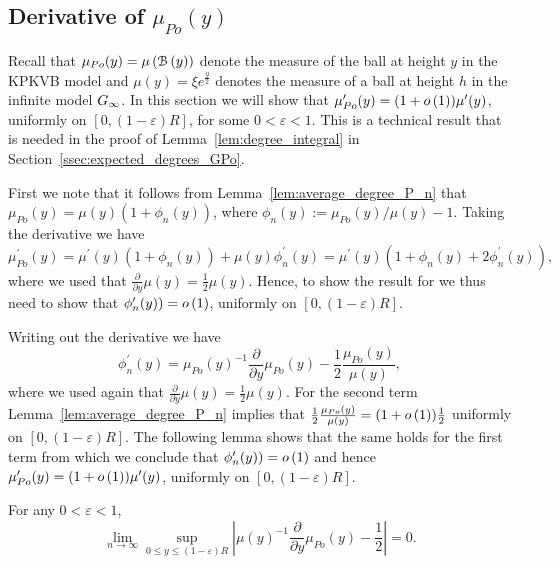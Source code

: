\begin{appendices}
\section{Derivative of $\mu_{Po}(y)$}

Recall that $\mu_{Po}(y) = \mu\left({\mathcal B}\left(y\right)\right)$ denote the measure of the ball at height $y$ in the KPKVB model and $\mu(y) = \xi e^{\frac{y}{2}}$ denotes the measure of a ball at height $h$ in the infinite model $G_{\infty}$. In this section we will show that $\mu_{Po}^\prime(y) = (1+o\left(1\right))\mu^\prime(y)$, uniformly on $[0,(1-\varepsilon)R]$, for some $0 < \varepsilon < 1$. This is a technical result that is needed in the proof of Lemma~\ref{lem:degree_integral} in Section~\ref{ssec:expected_degrees_GPo}.

First we note that it follows from Lemma~\ref{lem:average_degree_P_n} that $\mu_{Po}(y) = \mu(y)(1 + \phi_n(y))$, where $\phi_n(y) := \mu_{Po}(y)/\mu(y) - 1$. Taking the derivative we have
\[
	\mu_{Po}^\prime(y) = \mu^\prime(y)(1 + \phi_n(y)) + \mu(y)\phi_n^\prime(y)
	= \mu^\prime(y)(1 + \phi_n(y) + 2 \phi_n^\prime(y)),
\] 
where we used that $\frac{\partial}{\partial y} \mu(y) = \frac{1}{2}\mu(y)$. Hence, to show the result for we thus need to show that $\phi_n^\prime(y)) = o\left(1\right)$, uniformly on $[0,(1-\varepsilon)R]$. 

Writing out the derivative we have
\[
	\phi_n^\prime(y) = 
	\mu_{Po}(y) ^{-1} \frac{\partial}{\partial y} \mu_{Po}(y) -  \frac{1}{2} \frac{\mu_{Po}(y) }{\mu(y)},
\]
where we used again that $\frac{\partial}{\partial y} \mu(y) = \frac{1}{2}\mu(y)$. For the second term Lemma~\ref{lem:average_degree_P_n} implies that $\frac{1}{2} \frac{\mu_{Po}(y) }{\mu(y)} = (1+o\left(1\right))\frac{1}{2}$ uniformly on $[0,(1-\varepsilon)R]$. The following lemma shows that the same holds for the first term from which we conclude that $\phi_n^\prime(y)) = o\left(1\right)$ and hence $\mu_{Po}^\prime(y) = (1+o\left(1\right))\mu^\prime(y)$, uniformly on $[0,(1-\varepsilon)R]$.

\begin{lemma}\label{lem:derivative_mu_Po}
For any $0 < \varepsilon < 1$,
\[
	\lim_{n \to \infty} \sup_{0 \le y \le (1-\varepsilon)R} \left|\mu(y)^{-1}
	\frac{\partial}{\partial y} \mu_{Po}(y) - \frac{1}{2}\right| = 0.
\]
\end{lemma}


\end{appendices}

